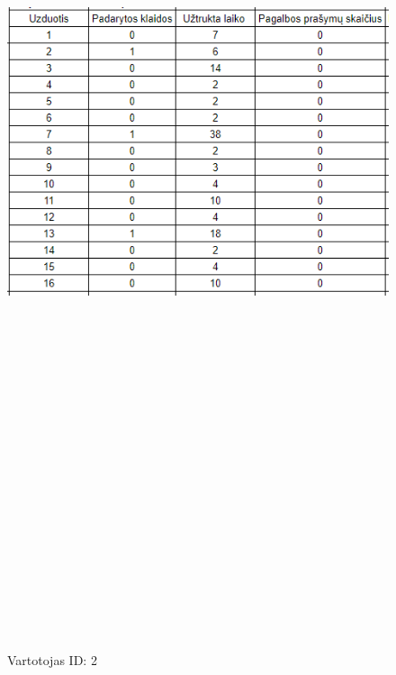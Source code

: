\documentclass[oneside]{VUMIFPSkursinis}
\begin{document}
\pagebreak

	\begin{figure}[ht]
			\centering
			\includegraphics[width=15cm,height=60cm,keepaspectratio]{2.png}
			\caption{ Vartotojas ID: 2}
	\end{figure}
\pagebreak
\end{document}
